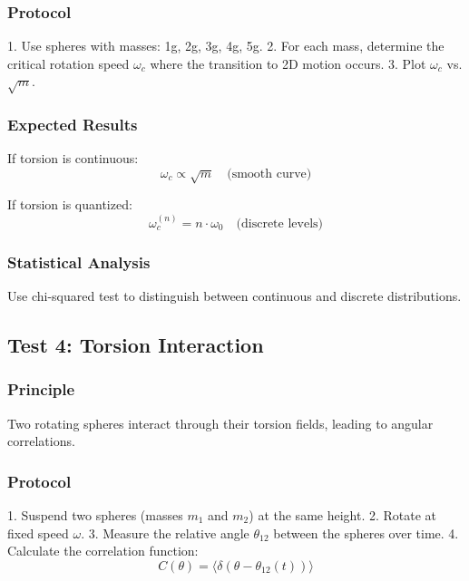 \documentclass[12pt,a4paper]{article}
\begin{document}
\subsubsection{Protocol}

1. Use spheres with masses: 1g, 2g, 3g, 4g, 5g.
2. For each mass, determine the critical rotation speed $\omega_c$ where the transition to 2D motion occurs.
3. Plot $\omega_c$ vs. $\sqrt{m}$.

\subsubsection{Expected Results}

If torsion is continuous:
\begin{equation}
    \omega_c \propto \sqrt{m} \quad \text{(smooth curve)}
\end{equation}

If torsion is quantized:
\begin{equation}
    \omega_c^{(n)} = n \cdot \omega_0 \quad \text{(discrete levels)}
\end{equation}

\subsubsection{Statistical Analysis}

Use chi-squared test to distinguish between continuous and discrete distributions.

\subsection{Test 4: Torsion Interaction}

\subsubsection{Principle}

Two rotating spheres interact through their torsion fields, leading to angular correlations.

\subsubsection{Protocol}

1. Suspend two spheres (masses $m_1$ and $m_2$) at the same height.
2. Rotate at fixed speed $\omega$.
3. Measure the relative angle $\theta_{12}$ between the spheres over time.
4. Calculate the correlation function:
\begin{equation}
    C(\theta) = \langle\delta(\theta - \theta_{12}(t))\rangle
\end{equation}
\end{document}
